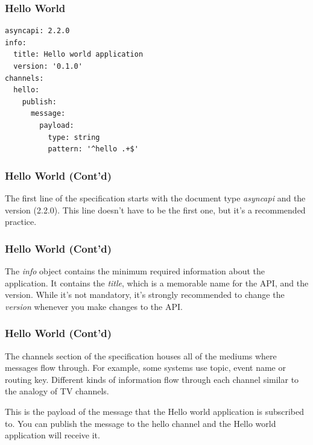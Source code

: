\documentclass{efd-lecture}
\begin{document}
\begin{frame}[fragile]
  \frametitle{Hello World}
  \begin{verbatim}
asyncapi: 2.2.0
info:
  title: Hello world application
  version: '0.1.0'
channels:
  hello:
    publish:
      message:
        payload:
          type: string
          pattern: '^hello .+$'
  \end{verbatim}
\end{frame}

\begin{frame}[fragile]
  \frametitle{Hello World (Cont'd)}
  \begin{block}{}
    The first line of the specification starts with the document type \textit{\color{YellowOrange} asyncapi} and the version (2.2.0).
    This line doesn't have to be the first one,
    but it's a recommended practice.
  \end{block}
\end{frame}

\begin{frame}[fragile]
  \frametitle{Hello World (Cont'd)}
  \begin{block}{}
    The \textit{\color{YellowOrange} info} object contains the minimum required information about the application.
    It contains the \textit{\color{YellowGreen} title}, which is a memorable name for the API, and the version. While it's not mandatory,
    it's strongly recommended to change the \textit{\color{YellowGreen} version} whenever you make changes to the API\@.
  \end{block}
\end{frame}

\begin{frame}[fragile]
  \frametitle{Hello World (Cont'd)}
  \begin{block}{}
    The channels section of the specification houses all of the mediums where messages flow through. For example,
    some systems use topic, event name or routing key.
    Different kinds of information flow through each channel similar to the analogy of TV channels.
  \end{block}
\end{frame}

\begin{frame}
  \begin{block}{}
    This is the payload of the message that the Hello world application is subscribed to.
    You can publish the message to the hello channel and the Hello world application will receive it.
  \end{block}
\end{frame}
\end{document}
